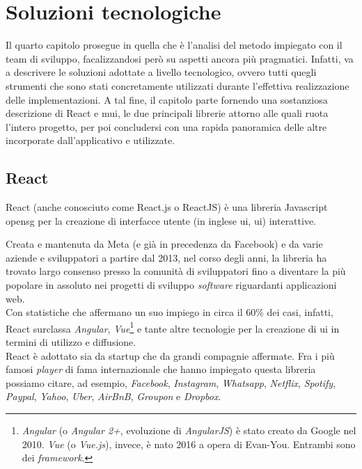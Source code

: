 
\chapter{Soluzioni tecnologiche}
Il quarto capitolo prosegue in quella che è l'analisi del metodo impiegato con il team di sviluppo, facalizzandosi però su aspetti ancora più pragmatici. Infatti, va a descrivere le soluzioni adottate a livello tecnologico, ovvero tutti quegli strumenti che sono stati concretamente utilizzati durante l'effettiva realizzazione delle implementazioni. A tal fine, il capitolo parte fornendo una sostanziosa descrizione di React e \acrlong{mui}, le due principali librerie attorno alle quali ruota l'intero progetto, per poi concludersi con una rapida panoramica delle altre incorporate dall'applicativo e utilizzate.

\section{React}
\label{sec:React}
React (anche conosciuto come React.js o ReactJS) è una libreria Javascript \gls{opensg} per la creazione di interfacce utente (in inglese \acrlong{ui}, \acrshort{ui}) interattive.

Creata e mantenuta da Meta (e già in precedenza da Facebook) e da varie aziende e sviluppatori a partire dal 2013, nel corso degli anni, la libreria ha trovato largo consenso presso la comunità di sviluppatori fino a diventare la più popolare in assoluto nei progetti di sviluppo \textit{software} riguardanti applicazioni web.\\
Con statistiche che affermano un suo impiego in circa il 60\% dei casi, infatti, React surclassa \textit{Angular}, \textit{Vue}\footnote{\textit{Angular} (o \textit{Angular 2+}, evoluzione di \textit{AngularJS}) è stato creato da Google nel 2010. \textit{Vue} (o \textit{Vue.js}), invece, è nato 2016 a opera di Evan-You. Entrambi sono dei \textit{framework}.} e tante altre tecnologie per la creazione di \acrshort{ui} in termini di utilizzo e diffusione.\\
React è adottato sia da startup che da grandi compagnie affermate. Fra i più famosi \textit{player} di fama internazionale che hanno impiegato questa libreria possiamo citare, ad esempio, \textit{Facebook}, \textit{Instagram}, \textit{Whatsapp}, \textit{Netflix}, \textit{Spotify}, \textit{Paypal}, \textit{Yahoo}, \textit{Uber}, \textit{AirBnB}, \textit{Groupon} e \textit{Dropbox}.

